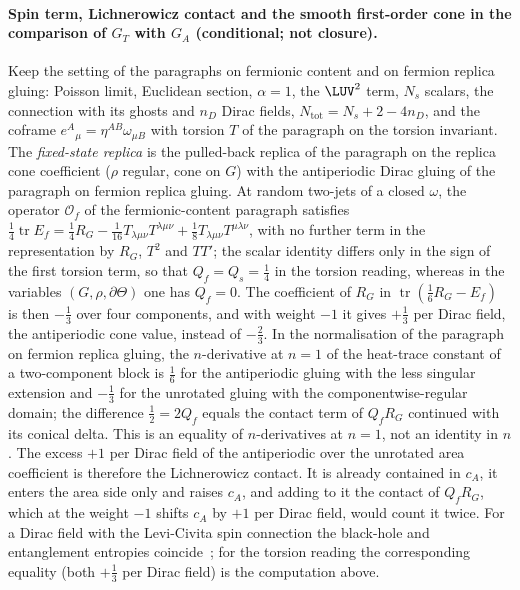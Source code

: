 \paragraph{Spin term, Lichnerowicz contact and the smooth first-order cone in the comparison of \(G_T\) with \(G_A\) (conditional; not closure).}
Keep the setting of the paragraphs on fermionic content and on fermion replica gluing: Poisson limit, Euclidean section, \(\alpha=1\), the \(\LUV^2\) term, \(N_s\) scalars, the connection with its ghosts and \(n_D\) Dirac fields, \(N_{\mathrm{tot}}=N_s+2-4n_D\), and the coframe \(e^A{}_\mu=\eta^{AB}\omega_{\mu B}\) with torsion \(T\) of the paragraph on the torsion invariant. The \emph{fixed-state replica} is the pulled-back replica of the paragraph on the replica cone coefficient (\(\rho\) regular, cone on \(G\)) with the antiperiodic Dirac gluing of the paragraph on fermion replica gluing. At random two-jets of a closed \(\omega\), the operator \(\mathcal O_f\) of the fermionic-content paragraph satisfies \(\tfrac14\operatorname{tr}E_f=\tfrac14R_G-\tfrac1{16}T_{\lambda\mu\nu}T^{\lambda\mu\nu}+\tfrac18T_{\lambda\mu\nu}T^{\mu\lambda\nu}\), with no further term in the representation by \(R_G\), \(T^2\) and \(TT'\); the scalar identity differs only in the sign of the first torsion term, so that \(Q_f=Q_s=\tfrac14\) in the torsion reading, whereas in the variables \((G,\rho,\partial\Theta)\) one has \(Q_f=0\). The coefficient of \(R_G\) in \(\operatorname{tr}(\tfrac16R_G-E_f)\) is then \(-\tfrac13\) over four components, and with weight \(-1\) it gives \(+\tfrac13\) per Dirac field, the antiperiodic cone value, instead of \(-\tfrac23\). In the normalisation of the paragraph on fermion replica gluing, the \(n\)-derivative at \(n=1\) of the heat-trace constant of a two-component block is \(\tfrac16\) for the antiperiodic gluing with the less singular extension and \(-\tfrac13\) for the unrotated gluing with the componentwise-regular domain; the difference \(\tfrac12=2Q_f\) equals the contact term of \(Q_fR_G\) continued with its conical delta. This is an equality of \(n\)-derivatives at \(n=1\), not an identity in \(n\). The excess \(+1\) per Dirac field of the antiperiodic over the unrotated area coefficient is therefore the Lichnerowicz contact. It is already contained in \(c_A\), it enters the area side only and raises \(c_A\), and adding to it the contact of \(Q_fR_G\), which at the weight \(-1\) shifts \(c_A\) by \(+1\) per Dirac field, would count it twice. For a Dirac field with the Levi-Civita spin connection the black-hole and entanglement entropies coincide~\cite{Kabat1995}; for the torsion reading the corresponding equality (both \(+\tfrac13\) per Dirac field) is the computation above.

